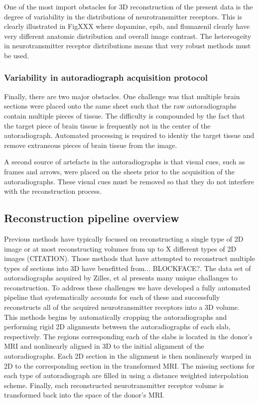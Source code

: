 \documentclass[12pt]{article}
\begin{document}
One of the most import obstacles for 3D reconstruction of the present data is the degree of variability in the distributions of neurotransmitter receptors. This is clearly illustrated in FigXXX where dopamine, epib, and flumazenil clearly have very different anatomic distribution and overall image contrast. The hetereogeity in neurotransmitter receptor distributions means that very robust methods must be used.

\subsubsection{Variability in autoradiograph acquisition protocol }

Finally, there are two major obstacles. One challenge was that multiple brain sections were placed onto the same sheet such that the raw autoradiographs contain multiple pieces of tissue. The difficulty is compounded by the fact that the target piece of brain tissue is frequently not in the center of the autoradiograph. Automated processing is required to identiy the target tissue and remove extraneous pieces of brain tissue from the image. 

A second source of artefacts in the autoradiographs is that visual cues, such as frames and arrows, were placed on the sheets prior to the acquisition of the autoradiographs. These visual cues must be removed so that they do not interfere with the reconstruction process. 

\subsection{Reconstruction pipeline overview}
Previous methods have typically focused on reconstructing a single type of 2D image or at most reconstructing volumes from up to X different types of 2D images (CITATION). Those methods that have attempted to reconstruct multiple types of sections into 3D have benefitted from... BLOCKFACE?. The data set of autoradiographs acquired by Zilles, et al \cite{Zilles2004} presents many unique challanges to reconstruction. To address these challenges we have developed a fully automated pipeline that systematically accounts for each of these and successfully reconstructs all of the acquired neurotransmitter receptors into a 3D volume. This methods begins by automatically cropping the autoradiographs and performing rigid 2D alignments between the autoradiographs of each slab, respectively. The regions corresponding each of the slabs is located in the donor's MRI and nonlinearly aligned in 3D to the initial alignment of the autoradiographs. Each 2D section in the alignment is then nonlinearly warped in 2D to the corresponding section in the transformed MRI. The missing sections for each type of autoradiograph are filled in using a distance weighted interpolation scheme. Finally, each reconstructed neurotransmitter receptor volume is transformed back into the space of the donor's MRI.
\end{document}
